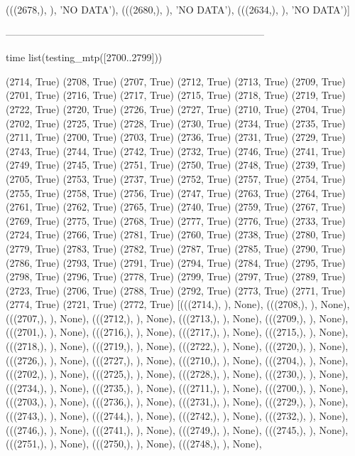  (((2678,), {}), 'NO DATA'),
 (((2680,), {}), 'NO DATA'),
 (((2634,), {}), 'NO DATA')]

 ------------------------------------------------------------------------------
  
 time list(testing_mtp([2700..2799]))

 (2714, True)
(2708, True)
(2707, True)
(2712, True)
(2713, True)
(2709, True)
(2701, True)
(2716, True)
(2717, True)
(2715, True)
(2718, True)
(2719, True)
(2722, True)
(2720, True)
(2726, True)
(2727, True)
(2710, True)
(2704, True)
(2702, True)
(2725, True)
(2728, True)
(2730, True)
(2734, True)
(2735, True)
(2711, True)
(2700, True)
(2703, True)
(2736, True)
(2731, True)
(2729, True)
(2743, True)
(2744, True)
(2742, True)
(2732, True)
(2746, True)
(2741, True)
(2749, True)
(2745, True)
(2751, True)
(2750, True)
(2748, True)
(2739, True)
(2705, True)
(2753, True)
(2737, True)
(2752, True)
(2757, True)
(2754, True)
(2755, True)
(2758, True)
(2756, True)
(2747, True)
(2763, True)
(2764, True)
(2761, True)
(2762, True)
(2765, True)
(2740, True)
(2759, True)
(2767, True)
(2769, True)
(2775, True)
(2768, True)
(2777, True)
(2776, True)
(2733, True)
(2724, True)
(2766, True)
(2781, True)
(2760, True)
(2738, True)
(2780, True)
(2779, True)
(2783, True)
(2782, True)
(2787, True)
(2785, True)
(2790, True)
(2786, True)
(2793, True)
(2791, True)
(2794, True)
(2784, True)
(2795, True)
(2798, True)
(2796, True)
(2778, True)
(2799, True)
(2797, True)
(2789, True)
(2723, True)
(2706, True)
(2788, True)
(2792, True)
(2773, True)
(2771, True)
(2774, True)
(2721, True)
(2772, True)
[(((2714,), {}), None),
 (((2708,), {}), None),
 (((2707,), {}), None),
 (((2712,), {}), None),
 (((2713,), {}), None),
 (((2709,), {}), None),
 (((2701,), {}), None),
 (((2716,), {}), None),
 (((2717,), {}), None),
 (((2715,), {}), None),
 (((2718,), {}), None),
 (((2719,), {}), None),
 (((2722,), {}), None),
 (((2720,), {}), None),
 (((2726,), {}), None),
 (((2727,), {}), None),
 (((2710,), {}), None),
 (((2704,), {}), None),
 (((2702,), {}), None),
 (((2725,), {}), None),
 (((2728,), {}), None),
 (((2730,), {}), None),
 (((2734,), {}), None),
 (((2735,), {}), None),
 (((2711,), {}), None),
 (((2700,), {}), None),
 (((2703,), {}), None),
 (((2736,), {}), None),
 (((2731,), {}), None),
 (((2729,), {}), None),
 (((2743,), {}), None),
 (((2744,), {}), None),
 (((2742,), {}), None),
 (((2732,), {}), None),
 (((2746,), {}), None),
 (((2741,), {}), None),
 (((2749,), {}), None),
 (((2745,), {}), None),
 (((2751,), {}), None),
 (((2750,), {}), None),
 (((2748,), {}), None),
